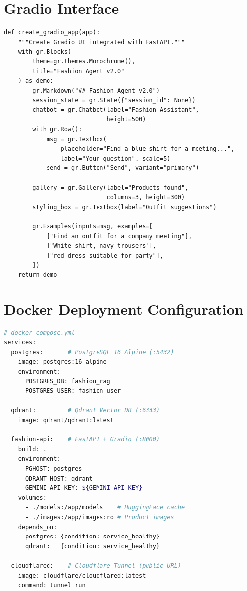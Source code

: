 \documentclass[12pt, twoside]{report}
\begin{document}
\section{Gradio Interface}

\begin{lstlisting}[caption={Gradio Chat Interface --- api/main.py}]
def create_gradio_app(app):
    """Create Gradio UI integrated with FastAPI."""
    with gr.Blocks(
        theme=gr.themes.Monochrome(),
        title="Fashion Agent v2.0"
    ) as demo:
        gr.Markdown("## Fashion Agent v2.0")
        session_state = gr.State({"session_id": None})
        chatbot = gr.Chatbot(label="Fashion Assistant",
                             height=500)
        with gr.Row():
            msg = gr.Textbox(
                placeholder="Find a blue shirt for a meeting...",
                label="Your question", scale=5)
            send = gr.Button("Send", variant="primary")

        gallery = gr.Gallery(label="Products found",
                             columns=3, height=300)
        styling_box = gr.Textbox(label="Outfit suggestions")

        gr.Examples(inputs=msg, examples=[
            ["Find an outfit for a company meeting"],
            ["White shirt, navy trousers"],
            ["red dress suitable for party"],
        ])
    return demo
\end{lstlisting}

\section{Docker Deployment Configuration}

\begin{lstlisting}[language=bash,caption={Docker Compose --- 4 services}]
# docker-compose.yml
services:
  postgres:       # PostgreSQL 16 Alpine (:5432)
    image: postgres:16-alpine
    environment:
      POSTGRES_DB: fashion_rag
      POSTGRES_USER: fashion_user

  qdrant:         # Qdrant Vector DB (:6333)
    image: qdrant/qdrant:latest

  fashion-api:    # FastAPI + Gradio (:8000)
    build: .
    environment:
      PGHOST: postgres
      QDRANT_HOST: qdrant
      GEMINI_API_KEY: ${GEMINI_API_KEY}
    volumes:
      - ./models:/app/models    # HuggingFace cache
      - ./images:/app/images:ro # Product images
    depends_on:
      postgres: {condition: service_healthy}
      qdrant:   {condition: service_healthy}

  cloudflared:    # Cloudflare Tunnel (public URL)
    image: cloudflare/cloudflared:latest
    command: tunnel run
\end{lstlisting}
\end{document}
